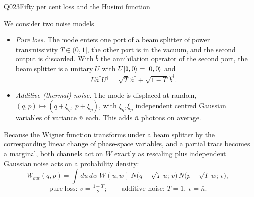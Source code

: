 \begin{entry}{Q023}{Fifty per cent loss and the Husimi function}
\begin{problem}
We consider two noise models.
\begin{itemize}
  \item \emph{Pure loss.} The mode enters one port of a beam splitter of power
        transmissivity $T\in(0,1]$, the other port is in the vacuum, and the second
        output is discarded. With $\hat b$ the annihilation operator of the second port,
        the beam splitter is a unitary $U$ with $U\lvert 0,0 \rangle=\lvert 0,0 \rangle$ and
        \begin{equation}
          U\hat a^{\dagger}U^{\dagger}=\sqrt T\,\hat a^{\dagger}+\sqrt{1-T}\,\hat b^{\dagger}.
          \label{q023:beam-splitter}
        \end{equation}
  \item \emph{Additive (thermal) noise.} The mode is displaced at random,
        $(q,p)\mapsto(q+\xi_q,\,p+\xi_p)$, with $\xi_q,\xi_p$ independent centred Gaussian
        variables of variance $\bar n$ each. This adds $\bar n$ photons on average.
\end{itemize}
Because the Wigner function transforms under a beam splitter by the corresponding linear
change of phase-space variables, and a partial trace becomes a marginal, both channels act
on $W$ exactly as rescaling plus independent Gaussian noise acts on a probability density:
\begin{equation}
  W_{ out}(q,p)=\int du\,dw\;W(u,w)\,N\bigl(q-\sqrt T\,u;\,v\bigr)\,N\bigl(p-\sqrt T\,w;\,v\bigr),
  \label{q023:channel}
\end{equation}
\begin{equation}
  \text{pure loss: }v=\tfrac{1-T}{2};
  \qquad
  \text{additive noise: }T=1,\ v=\bar n .
  \label{q023:variances}
\end{equation}


\end{problem}
\end{entry}
